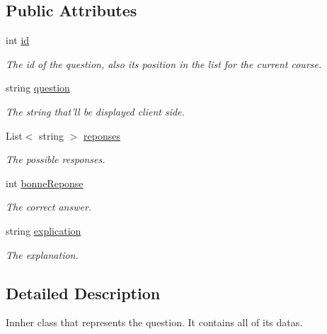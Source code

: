 \subsection*{Public Attributes}
\begin{DoxyCompactItemize}
\item 
int \hyperlink{class_question_manager_1_1_question_keeper_a138a6e1780e60984e78213c87a07d17c}{id}
\begin{DoxyCompactList}\small\item\em The id of the question, also its position in the list for the current course. \end{DoxyCompactList}\item 
string \hyperlink{class_question_manager_1_1_question_keeper_a2d1efc6611877e295d3b8c3420105c07}{question}
\begin{DoxyCompactList}\small\item\em The string that'll be displayed client side.\end{DoxyCompactList}\item 
List$<$ string $>$ \hyperlink{class_question_manager_1_1_question_keeper_ae15a995b88e9a00ff9097a3b298c8ca1}{reponses}
\begin{DoxyCompactList}\small\item\em The possible responses.\end{DoxyCompactList}\item 
int \hyperlink{class_question_manager_1_1_question_keeper_ae93fc2856d926f7cee74c9e1c2e802f6}{bonne\-Reponse}
\begin{DoxyCompactList}\small\item\em The correct answer.\end{DoxyCompactList}\item 
string \hyperlink{class_question_manager_1_1_question_keeper_a6034ad0eb05b0a295e4fedea05d42466}{explication}
\begin{DoxyCompactList}\small\item\em The explanation.\end{DoxyCompactList}\end{DoxyCompactItemize}


\subsection{Detailed Description}
Innher class that represents the question. It contains all of its datas. 



